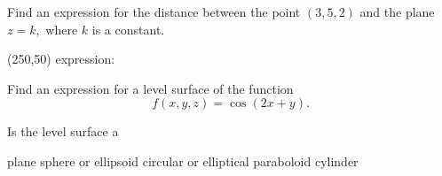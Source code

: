 \documentclass[12pt,letterpaper,noanswers]{exam}
\begin{document}
 \pdfpageheight 11in 
  \pdfpagewidth 8.5in


\begin{questions}
\item Find an expression for the distance between the point $(3,5,2)$ and the plane $z = k,$ where $k$ is a constant.

\vfill

\framebox(250,50){ expression:\hfill }

\item Find an expression for a level surface of the function \[f(x,y,z) = \cos{(2x+y)}.\]

Is the level surface a 

\begin{oneparcheckboxes}
\choice plane
\choice sphere or ellipsoid
\choice circular or elliptical paraboloid
\choice cylinder
\end{oneparcheckboxes}

\vfill
\end{questions}
\end{document}
